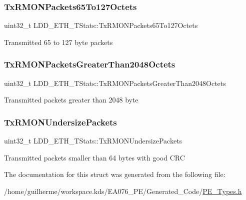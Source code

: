 \subsubsection{\texorpdfstring{Tx\+R\+M\+O\+N\+Packets65\+To127\+Octets}{TxRMONPackets65To127Octets}}
{\footnotesize\ttfamily uint32\+\_\+t L\+D\+D\+\_\+\+E\+T\+H\+\_\+\+T\+Stats\+::\+Tx\+R\+M\+O\+N\+Packets65\+To127\+Octets}

Transmitted 65 to 127 byte packets \mbox{\label{struct_l_d_d___e_t_h___t_stats_a8f892961bd1e66bf6c75e6acec8d8816}} 
\subsubsection{\texorpdfstring{Tx\+R\+M\+O\+N\+Packets\+Greater\+Than2048\+Octets}{TxRMONPacketsGreaterThan2048Octets}}
{\footnotesize\ttfamily uint32\+\_\+t L\+D\+D\+\_\+\+E\+T\+H\+\_\+\+T\+Stats\+::\+Tx\+R\+M\+O\+N\+Packets\+Greater\+Than2048\+Octets}

Transmitted packets greater than 2048 byte \mbox{\label{struct_l_d_d___e_t_h___t_stats_a71c3b9e66b78d20604a952804089a347}} 
\subsubsection{\texorpdfstring{Tx\+R\+M\+O\+N\+Undersize\+Packets}{TxRMONUndersizePackets}}
{\footnotesize\ttfamily uint32\+\_\+t L\+D\+D\+\_\+\+E\+T\+H\+\_\+\+T\+Stats\+::\+Tx\+R\+M\+O\+N\+Undersize\+Packets}

Transmitted packets smaller than 64 bytes with good C\+RC 

The documentation for this struct was generated from the following file\+:\begin{DoxyCompactItemize}
\item 
/home/guilherme/workspace.\+kds/\+E\+A076\+\_\+\+P\+E/\+Generated\+\_\+\+Code/\hyperlink{_p_e___types_8h}{P\+E\+\_\+\+Types.\+h}\end{DoxyCompactItemize}
